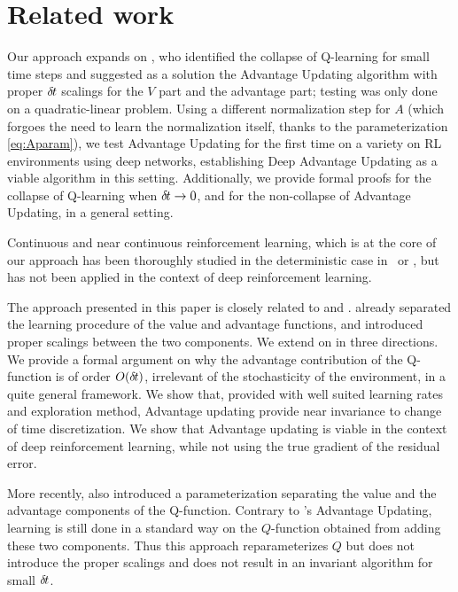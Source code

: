 \section{Related work}
\label{sec:related}

Our approach expands on \cite{adv_upd}, who identified the collapse of
Q-learning for small time steps and suggested as a solution the Advantage Updating
algorithm with proper ${\delta\hspace{-.1em}t}$ scalings for the $V$ part and the
advantage part; testing was only
done on a quadratic-linear problem. Using a different normalization step
for $A$ (which forgoes the need to learn the normalization itself, thanks
to the parameterization \eqref{eq:Aparam}), we test Advantage Updating
for the first time on a variety on RL environments using deep networks,
establishing Deep Advantage Updating as a viable algorithm in this
setting.  Additionally, we provide formal proofs for the collapse of
Q-learning when ${\delta\hspace{-.1em}t}\to 0$, and for the non-collapse of Advantage
Updating, in a general setting.


Continuous and near continuous reinforcement learning, which is at the core of
our approach has been thoroughly studied in the deterministic case
in~\cite{adv_upd} or \cite{cont_rl}, but has not been applied in the context of
deep reinforcement learning.

The approach presented in this paper is closely related to \cite{adv_upd} and
\cite{cont_rl}. \cite{adv_upd} already separated the learning procedure of the
value and advantage functions, and introduced proper scalings between the two
components. We extend on \cite{adv_upd} in three directions. We provide a
formal argument on why the advantage contribution of the Q-function is of order
$O({\delta\hspace{-.1em}t})$, irrelevant of the stochasticity of the environment, in a quite
general framework. We show that, provided with well suited learning rates and
exploration method, Advantage updating provide near invariance to change of time
discretization. We show that Advantage updating is viable in the context of deep
reinforcement learning, while not using the true gradient of the residual error.

More recently, \cite{dueling_nets} also introduced a parameterization separating
the value and the advantage components of the Q-function. Contrary to
\cite{advup}'s Advantage Updating, learning is still done in a standard
way on the $Q$-function obtained from adding these two components. Thus this
approach reparameterizes $Q$ but does not introduce the proper scalings
and does not result in an invariant algorithm for small ${\delta\hspace{-.1em}t}$.%


